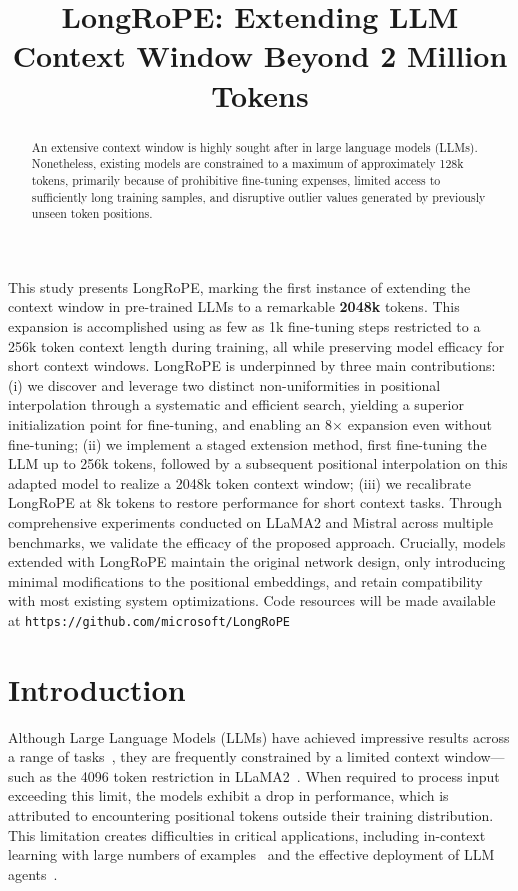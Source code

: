 \title{LongRoPE: Extending LLM Context Window Beyond 2 Million Tokens}

\begin{abstract}
An extensive context window is highly sought after in large language models (LLMs). Nonetheless, existing models are constrained to a maximum of approximately 128k tokens, primarily because of prohibitive fine-tuning expenses, limited access to sufficiently long training samples, and disruptive outlier values generated by previously unseen token positions.
\end{abstract}

This study presents LongRoPE, marking the first instance of extending the context window in pre-trained LLMs to a remarkable \textbf{2048k} tokens. This expansion is accomplished using as few as 1k fine-tuning steps restricted to a 256k token context length during training, all while preserving model efficacy for short context windows. LongRoPE is underpinned by three main contributions: (i) we discover and leverage two distinct non-uniformities in positional interpolation through a systematic and efficient search, yielding a superior initialization point for fine-tuning, and enabling an 8$\times$ expansion even without fine-tuning; (ii) we implement a staged extension method, first fine-tuning the LLM up to 256k tokens, followed by a subsequent positional interpolation on this adapted model to realize a 2048k token context window; (iii) we recalibrate LongRoPE at 8k tokens to restore performance for short context tasks. Through comprehensive experiments conducted on LLaMA2 and Mistral across multiple benchmarks, we validate the efficacy of the proposed approach. Crucially, models extended with LongRoPE maintain the original network design, only introducing minimal modifications to the positional embeddings, and retain compatibility with most existing system optimizations. Code resources will be made available at \texttt{https://github.com/microsoft/LongRoPE}

\section{Introduction}

Although Large Language Models (LLMs) have achieved impressive results across a range of tasks~\cite{gpt4,llama2}, they are frequently constrained by a limited context window—such as the 4096 token restriction in LLaMA2~\cite{llama2}. When required to process input exceeding this limit, the models exhibit a drop in performance, which is attributed to encountering positional tokens outside their training distribution. This limitation creates difficulties in critical applications, including in-context learning with large numbers of examples~\cite{Huang2023FewerIM} and the effective deployment of LLM agents~\cite{park2023generative,madaan2023selfrefine}.

